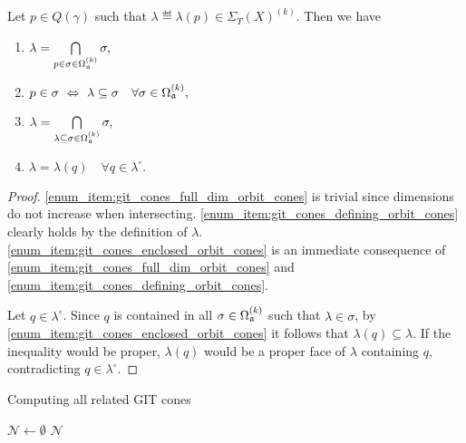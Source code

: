 \begin{lemma}
	\label{lemma:git_cones_elementary_properties}
	Let $p\in Q(\gamma)$ such that $\lambda \eqdef \lambda(p)\in\Sigma_T(X)^{(k)}$. Then we have
	\begin{enumerate}[label={\upshape(\roman*)}]
		\item $\lambda = \bigcap\limits_{p\in\sigma\in\Omega_{\mathfrak{a}}^{(k)}}\sigma,$
			\label{enum_item:git_cones_full_dim_orbit_cones}
		\item $p\in\sigma\ \Leftrightarrow\ \lambda\subseteq\sigma\quad\forall\sigma\in\Omega_\ideal^{(k)},$
			\label{enum_item:git_cones_defining_orbit_cones}
		\item $\lambda = \bigcap\limits_{\lambda\subseteq\sigma\in\Omega_{\mathfrak{a}}^{(k)}}\sigma,$
			\label{enum_item:git_cones_enclosed_orbit_cones}
		\item $\lambda = \lambda(q)\quad \forall q\in\lambda^\circ.$
			\label{enum_item:git_cones_relative_interior}
	\end{enumerate}
\end{lemma}
\begin{proof}
	\ref{enum_item:git_cones_full_dim_orbit_cones} is trivial since dimensions do not increase when intersecting. \ref{enum_item:git_cones_defining_orbit_cones} clearly holds by the definition of $\lambda$. \ref{enum_item:git_cones_enclosed_orbit_cones} is an immediate consequence of \ref{enum_item:git_cones_full_dim_orbit_cones} and \ref{enum_item:git_cones_defining_orbit_cones}.
	
	Let $q\in\lambda^\circ$. Since $q$ is contained in all $\sigma\in\Omega_{\mathfrak{a}}^{(k)}$ such that $\lambda\in\sigma$, by \ref{enum_item:git_cones_enclosed_orbit_cones} it follows that $\lambda(q)\subseteq\lambda$. If the inequality would be proper, $\lambda(q)$ would be a proper face of $\lambda$ containing $q$, contradicting $q\in\lambda^\circ$.
\end{proof}

\begin{algorithm}
	\caption{Computing all related GIT cones}
	\label{algo:compute_git_cone_neighbours}
	
	\BlankLine
	$\mathcal{N} \leftarrow \emptyset$\;
	\Return $\mathcal{N}$\;
\end{algorithm}

